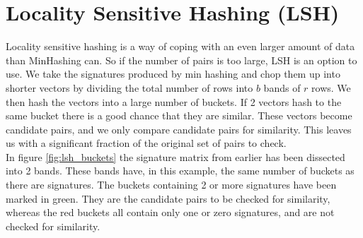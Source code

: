 \documentclass[a4paper,11pt]{article}
\begin{document}
%        


\section{Locality Sensitive Hashing (LSH)}
Locality sensitive hashing is a way of coping with an even larger amount of data than MinHashing can. So if the number of pairs is too large, LSH is an option to use. We take the signatures produced by min hashing and chop them up into shorter vectors by dividing the total number of rows into $b$ bands of $r$ rows. We then hash the vectors into a large number of buckets. If 2 vectors hash to the same bucket there is a good chance that they are similar. These vectors become candidate pairs, and we only compare candidate pairs for similarity. This leaves us with a significant fraction of the original set of pairs to check. \\

In figure \ref{fig:lsh_buckets} the signature matrix from earlier has been dissected into 2 bands. These bands have, in this example, the same number of buckets as there are signatures. The buckets containing 2 or more signatures have been marked in green. They are the candidate pairs to be checked for similarity, whereas the red buckets all contain only one or zero signatures, and are not checked for similarity. \\
\end{document}
